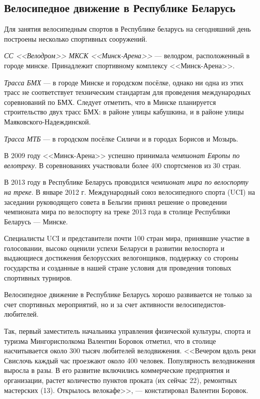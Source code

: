 \subsection{Велосипедное движение в Республике Беларусь}

Для занятия велосипедным спортов в Республике беларусь на сегодняшний день построены
несколько спортивных сооружений.

\textit{СС <<Велодром>> МКСК <<Минск-Арена>>} --- велодром, расположенный в городе минске.
Принадлежит спортивному комплексу <<Минск-Арена>>.

\textit{Трасса БМХ} --- в городе Минске и городском посёлке, однако ни одна из этих
трасс не соответствует техническим стандартам для проведения международных соревнований
по БМХ. Следует отметить, что в Минске планируется строительство двух трасс БМХ:
в районе улицы кабушкина, и в районе улицы Маяковского-Надеждинской.

\textit{Трасса МТБ} --- в городском посёлке Силичи и в городах Борисов и Мозырь. 

В 2009 году <<Минск-Арена>>
успешно принимала \textit{чемпионат Европы по велотреку}. В соревнованиях
участвовали более 400 спортсменов из 30 стран\cite{velo_world_cup}.

В 2013 году в Республике Беларусь проводился \textit{чемпионат мира
по велоспорту на треке}. В январе 2012 г. Международный союз велосипедного спорта (UCI)
на заседании руководящего совета в Бельгии принял решение о проведении
чемпионата мира по велоспорту на треке 2013 года в столице Республики Беларусь --- Минске.

Специалисты UCI и представители почти 100 стран мира,
принявшие участие в голосовании, высоко оценили успехи Беларуси
в развитии велоспорта и выдающиеся достижения белорусских велогонщиков,
поддержку со стороны государства и созданные в нашей стране условия
для проведения топовых спортивных турниров.

Велосипедное движение в Республике Беларусь хорошо развивается
не только за счет спортивных мероприятий, но и за счет активности велосипедистов-любителей.

Так, первый заместитель начальника управления физической культуры, спорта и туризма
Мингорисполкома Валентин Боровок отметил, что в столице насчитывается около
300 тысяч любителей велодвижения. <<Вечером вдоль реки Свислочь каждый час
проезжают около 400 человек. Популярность велодвижения выросла в разы.
В его развитие включились коммерческие предприятия и организации,
растет количество пунктов проката (их сейчас 22), ремонтных мастерских (13).
Открылось велокафе>>, --- констатировал Валентин Боровок\cite{velo_infrastructure}.

